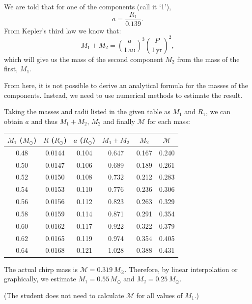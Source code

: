\begin{description}
  We are told that for one of the components (call it `1'),
  \[ a = \frac{R_1}{0.139}. \]
  From Kepler's third law we know that:
  \[ M_1 + M_2 = \left(\frac{a}{1\,\mathrm{au}}\right)^3
     \left(\frac{P}{1\,\mathrm{yr}}\right)^2, \]
  which will give us the mass of the second component $M_2$ from the mass of
  the first, $M_1$.

  From here, it is not possible to derive an analytical formula for the masses
  of the components. Instead, we need to use numerical methods to estimate the
  result.

  Taking the masses and radii listed in the given table as $M_1$ and $R_1$, we
  can obtain $a$ and thus $M_1 + M_2$, $M_2$ and finally $\mathcal{M}$ for
  each mass:

  \begin{center}
  \begin{tabular}{cccccc}
    \hline
    $M_1$ ($M_\odot$) & $R$ ($R_\odot$) & $a$ ($R_\odot$) & $M_1+M_2$ &
    $M_2$ & $\mathcal{M}$ \\
    \hline
    0.48 & 0.0144 & 0.104 & 0.647 & 0.167 & 0.240 \\
    0.50 & 0.0147 & 0.106 & 0.689 & 0.189 & 0.261 \\
    0.52 & 0.0150 & 0.108 & 0.732 & 0.212 & 0.283 \\
    0.54 & 0.0153 & 0.110 & 0.776 & 0.236 & 0.306 \\
    0.56 & 0.0156 & 0.112 & 0.823 & 0.263 & 0.329 \\
    0.58 & 0.0159 & 0.114 & 0.871 & 0.291 & 0.354 \\
    0.60 & 0.0162 & 0.117 & 0.922 & 0.322 & 0.379 \\
    0.62 & 0.0165 & 0.119 & 0.974 & 0.354 & 0.405 \\
    0.64 & 0.0168 & 0.121 & 1.028 & 0.388 & 0.431 \\
    \hline
  \end{tabular}
  \end{center}

  The actual chirp mass is $\mathcal{M} = 0.319\,M_\odot$. Therefore, by
  linear interpolation or graphically, we estimate $M_1 = 0.55\,M_\odot$ and
  $M_2 = 0.25\,M_\odot$.

  (The student does not need to calculate $\mathcal{M}$ for all values of
  $M_1$.)

\end{description}

